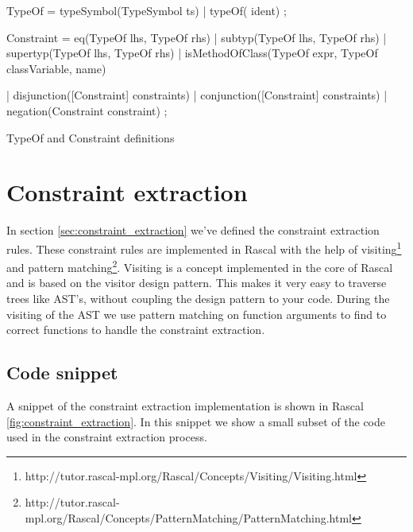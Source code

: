 \documentclass[../main.tex]{subfiles}
\begin{document}
    \begin{program}    
    \begin{rascal}%
 TypeOf
    = typeSymbol(TypeSymbol ts)
    | typeOf( ident)
    ;
        
 Constraint 
    = eq(TypeOf lhs, TypeOf rhs)
    | subtyp(TypeOf lhs, TypeOf rhs)
    | supertyp(TypeOf lhs, TypeOf rhs)
    | isMethodOfClass(TypeOf expr, TypeOf classVariable,  name)
    
    | disjunction([Constraint] constraints)
    | conjunction([Constraint] constraints) 
    | negation(Constraint constraint) 
    ;\end{rascal}%
	
	\caption{TypeOf and Constraint definitions}
	\label{fig:typeof_and_constraint}
	\end{program}
    
    \section{Constraint extraction}\label{sec:implementation:constraint_extraction}
    In section \ref{sec:constraint_extraction} we've defined the constraint extraction rules.
    These constraint rules are implemented in Rascal with the help of visiting\footnote{http://tutor.rascal-mpl.org/Rascal/Concepts/Visiting/Visiting.html} and pattern matching\footnote{http://tutor.rascal-mpl.org/Rascal/Concepts/PatternMatching/PatternMatching.html}.
    Visiting is a concept implemented in the core of Rascal and is based on the visitor design pattern.
    This makes it very easy to traverse trees like AST's, without coupling the design pattern to your code.
    During the visiting of the AST we use pattern matching on function arguments to find to correct functions to handle the constraint extraction. 
    
    \subsection{Code snippet}
    A snippet of the constraint extraction implementation\footnotemark{} is shown in Rascal \ref{fig:constraint_extraction}.
	In this snippet we show a small subset of the code used in the constraint extraction process.
	
\end{document}

